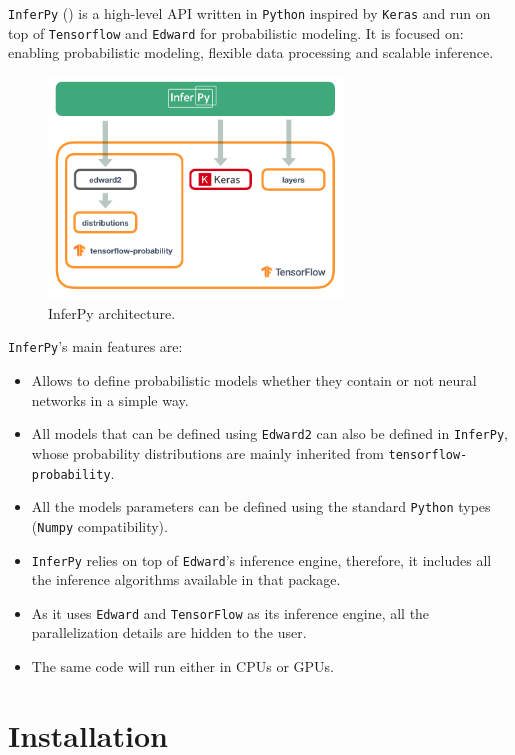 
\texttt{InferPy} (\cite{cozar2019inferpy}) is a high-level API written in \texttt{Python} inspired by \texttt{Keras} and run on top of \texttt{Tensorflow} and \texttt{Edward} for probabilistic modeling. It is focused on: enabling probabilistic modeling, flexible data processing and scalable inference.

\begin{figure}[h!]
    \centering
    \includegraphics[width=0.7\textwidth]{tex/images/arch.png}
    \caption{InferPy architecture.}
\end{figure}

\texttt{InferPy}'s main features are:
\begin{itemize}
  \item Allows to define probabilistic models whether they contain or not neural networks in a simple way.
  \item All models that can be defined using \texttt{Edward2} can also be defined in  \texttt{InferPy}, whose probability distributions are mainly inherited from \texttt{tensorflow-probability}.
  \item All the models parameters can be defined using the standard \texttt{Python} types (\texttt{Numpy} compatibility).
  \item \texttt{InferPy} relies on top of \texttt{Edward}'s inference engine, therefore, it includes all the inference algorithms available in that package.
  \item As it uses \texttt{Edward} and \texttt{TensorFlow} as its inference engine, all the parallelization details are hidden to the user.
  \item The same code will run either in CPUs or GPUs.
\end{itemize}

\section{Installation}

